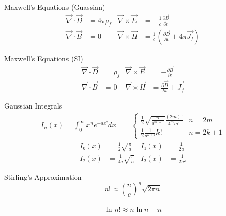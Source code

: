 \documentclass[avery5371]{flashcards}
\begin{document}


\begin{flashcard}{Maxwell's Equations (Guassian)}
	\begin{align*}
		\vec ∇ · \vec D &= 4πρ_f
			& \vec ∇ × \vec E &= -\frac 1c \frac{∂\vec B}{∂t}
		\\
		\vec ∇ · \vec B &= 0
			& \vec ∇ × \vec H &= \frac 1c ( \frac{∂\vec D}{∂t} + 4π \vec{J_f} )
	\end{align*}
\end{flashcard}

\begin{flashcard}{Maxwell's Equations (SI)}
	\begin{align*}
		\vec ∇ · \vec D &= ρ_f
			& \vec ∇ × \vec E &= -\frac{∂\vec B}{∂t}
		\\
		\vec ∇ · \vec B &= 0
			& \vec ∇ × \vec H &= \frac{∂\vec D}{∂t} + \vec{J_f}
	\end{align*}
\end{flashcard}


\begin{flashcard}{Gaussian Integrals}
	\begin{align*}
		I_n(x) = \!\! ∫_0^∞ \!\! x^n e^{-ax²} dx &=
			\begin{cases}
				\displaystyle
				\frac{1}{2} \sqrt{\frac{π}{a^{m+1}}} \frac{(2m)!}{4^m m!}
					& \text{$n = 2m$} \\
				\displaystyle
				\frac{1}{2} \frac{1}{a^{k+1}} k!
					& \text{$n = 2k + 1$}
			\end{cases}
	\end{align*}
	\vspace{-\baselineskip}
	\begin{align*}
		I₀(x) &= \frac 12 \sqrt{\frac π a}
			& I₁(x) &= \frac 1 {2a} \\
		I₂(x) &= \frac{1}{4a} \sqrt{\frac π a}
			& I₃(x) &= \frac 1 {2a²}
	\end{align*}
\end{flashcard}

\begin{flashcard}{Stirling's Approximation}
	\[ n! ≈ (\frac ne)^n \sqrt{2πn} \] \\
	\[ \ln n! ≈ n\ln n - n \]
\end{flashcard}
\end{document}
